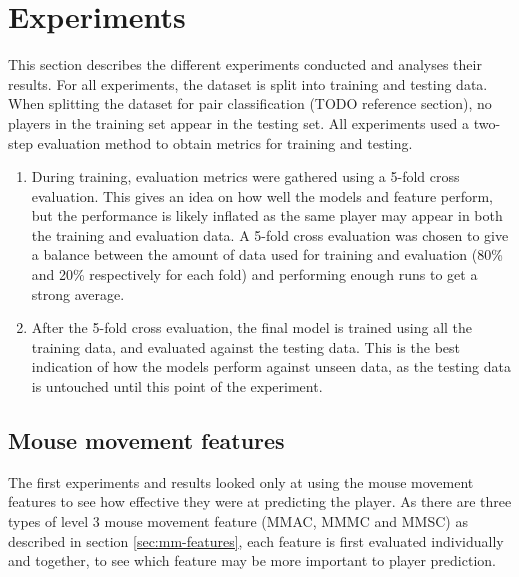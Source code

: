 \documentclass[Report.tex]{subfiles}
\begin{document}
\section{Experiments}
This section describes the different experiments conducted and analyses their results. For all experiments, the dataset is split into training and testing data. When splitting the dataset for pair classification (TODO reference section), no players in the training set appear in the testing set. All experiments used a two-step evaluation method to obtain metrics for training and testing.
\begin{enumerate}
\item During training, evaluation metrics were gathered using a 5-fold cross evaluation. This gives an idea on how well the models and feature perform, but the performance is likely inflated as the same player may appear in both the training and evaluation data. A 5-fold cross evaluation was chosen to give a balance between the amount of data used for training and evaluation (80\% and 20\% respectively for each fold) and performing enough runs to get a strong average. 
\item After the 5-fold cross evaluation, the final model is trained using all the training data, and evaluated against the testing data. This is the best indication of how the models perform against unseen data, as the testing data is untouched until this point of the experiment. 
\end{enumerate}

\subsection{Mouse movement features}
The first experiments and results looked only at using the mouse movement features to see how effective they were at predicting the player. As there are three types of level 3 mouse movement feature (MMAC, MMMC and MMSC) as described in section \ref{sec:mm-features}, each feature is first evaluated individually and together, to see which feature may be more important to player prediction. 
\end{document}
